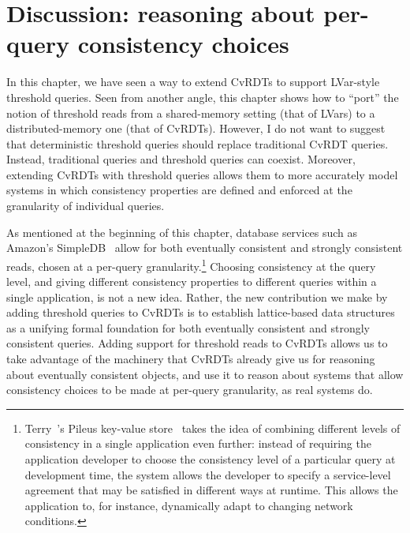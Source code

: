 \section{Discussion: reasoning about per-query consistency choices}\label{s:distributed-per-query-consistency}

In this chapter, we have seen a way to extend CvRDTs to support
LVar-style threshold queries.  Seen from another angle, this chapter
shows how to ``port'' the notion of threshold reads from a
shared-memory setting (that of LVars) to a distributed-memory one
(that of CvRDTs).  However, I do not want to suggest that
deterministic threshold queries should replace traditional CvRDT
queries.  Instead, traditional queries and threshold queries can
coexist.  Moreover, extending CvRDTs with threshold queries allows
them to more accurately model systems in which consistency properties
are defined and enforced at the granularity of individual queries.

As mentioned at the beginning of this chapter, database services such
as Amazon's SimpleDB~\cite{simpledb-vogels-article} allow for both
eventually consistent and strongly consistent reads, chosen at a
per-query granularity.\footnote{Terry~\etal's Pileus key-value
  store~\cite{pileus} takes the idea of combining different levels of
  consistency in a single application even further: instead of
  requiring the application developer to choose the consistency level
  of a particular query at development time, the system allows the
  developer to specify a service-level agreement that may be satisfied
  in different ways at runtime.  This allows the application to, for
  instance, dynamically adapt to changing network conditions.}
Choosing consistency at the query level, and giving different
consistency properties to different queries within a single
application, is not a new idea.  Rather, the new contribution we make
by adding threshold queries to CvRDTs is to establish lattice-based
data structures as a unifying formal foundation for both eventually
consistent and strongly consistent queries.  Adding support for
threshold reads to CvRDTs allows us to take advantage of the machinery
that CvRDTs already give us for reasoning about eventually consistent
objects, and use it to reason about systems that allow consistency
choices to be made at per-query granularity, as real systems do.

